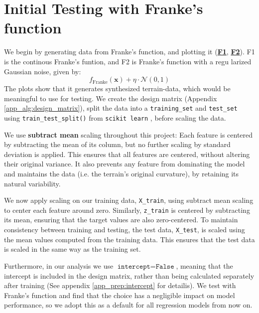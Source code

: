 \documentclass{article}
\begin{document}
\section*{Initial Testing with Franke’s function}
\begin{multicols}{2}
We begin by generating data from Franke’s function, and plotting it (\hyperref[fig:F1]{\textbf{F1}}, \hyperref[fig:F1]{\textbf{F2}}). F1 is the continous Franke's funtion, and F2 is Franke's function with a regu larized Gaussian noise, given by: 
$$f_{\text{Franke}}(\bm{x}) + \eta \cdot \mathcal{N}(0, 1)$$
The plots show that it generates synthesized terrain-data, which would be meaningful to use for testing.
We create the design matrix (Appendix \ref{app_alg:design_matrix}), split the data into a \texttt{training\_set} and \texttt{test\_set} using \texttt{train\_test\_split()} from \texttt{scikit learn} \cite{pedregosa_et_al_scikit-learn_2011}, before scaling the data. 

\begin{tcolorbox}[colback=gray!10, colframe=gray!10]
We use \textbf{subtract mean} scaling throughout this project: Each feature is centered by subtracting the mean of its column, but no further scaling by standard deviation is applied. This ensures that all features are centered, without altering their original variance. It also prevents any feature from dominating the model and maintains the data (i.e. the terrain's original curvature), by retaining its natural variability.
\end{tcolorbox}

We now apply scaling on our training data, \texttt{X\_train}, using subtract mean scaling to center each feature around zero. Similarly, \texttt{z\_train} is centered by subtracting its mean, ensuring that the target values are also zero-centered. To maintain consistency between training and testing, the test data, \texttt{X\_test}, is scaled using the mean values computed from the training data. This ensures that the test data is scaled in the same way as the training set.

Furthermore, in our analysis we use $\texttt{intercept} = \texttt{False}$, meaning that the intercept is included in the design matrix, rather than being calculated separately after training (See appendix \ref{app_prep:intercept} for detailis). We test with Franke's function and find that the choice has a negligible impact on model performance, so we adopt this as a default for all regression models from now on.


\end{multicols}
\end{document}
